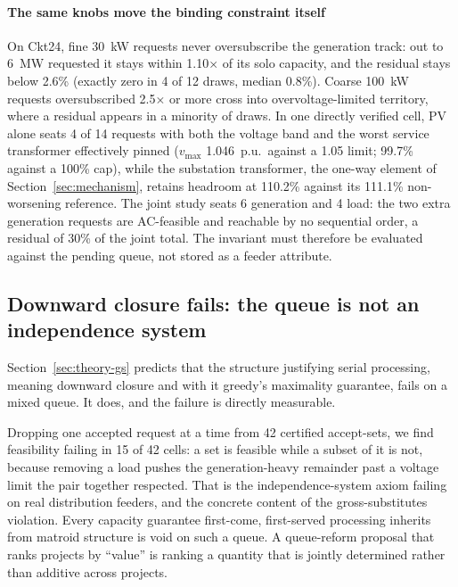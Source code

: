 \documentclass[review,authoryear,12pt]{elsarticle}
\begin{document}
\paragraph{The same knobs move the binding constraint itself}
On Ckt24, fine 30~kW requests never oversubscribe the generation track: out to
6~MW requested it stays within 1.10$\times$ of its solo capacity, and the
residual stays below 2.6\% (exactly zero in 4 of 12 draws, median 0.8\%).
Coarse 100~kW requests oversubscribed 2.5$\times$ or more cross into
overvoltage-limited territory, where a residual appears in a minority of
draws. In one directly verified cell, PV alone seats 4 of 14 requests with both
the voltage band and the worst service transformer effectively pinned
($v_{\max}$ 1.046~p.u.\ against a 1.05 limit; 99.7\% against a 100\% cap),
while the substation transformer, the one-way element of
Section~\ref{sec:mechanism}, retains headroom at 110.2\% against its 111.1\%
non-worsening reference. The joint study seats 6 generation and 4 load: the
two extra generation requests are AC-feasible and reachable by no sequential
order, a residual of 30\% of the joint total. The invariant must
therefore be evaluated against the pending queue, not stored as a feeder
attribute.

\subsection{Downward closure fails: the queue is not an independence system}
\label{sec:structure}

Section~\ref{sec:theory-gs} predicts that the structure justifying serial
processing, meaning downward closure and with it greedy's maximality guarantee,
fails on a mixed queue. It does, and the failure is directly measurable.

Dropping one accepted request at a time from 42 certified accept-sets, we find
feasibility failing in 15 of 42 cells: a set is feasible while a subset of it
is not, because removing a load pushes the generation-heavy remainder past a
voltage limit the pair together respected. That is the independence-system
axiom failing on real distribution feeders, and the concrete content of the
gross-substitutes violation. Every capacity guarantee first-come, first-served
processing inherits from matroid structure is void on such a queue. A
queue-reform proposal that ranks projects by ``value''
\citep{pollitt2026,eurelectric2025} is ranking a quantity that is jointly
determined rather than additive across projects.
\end{document}
